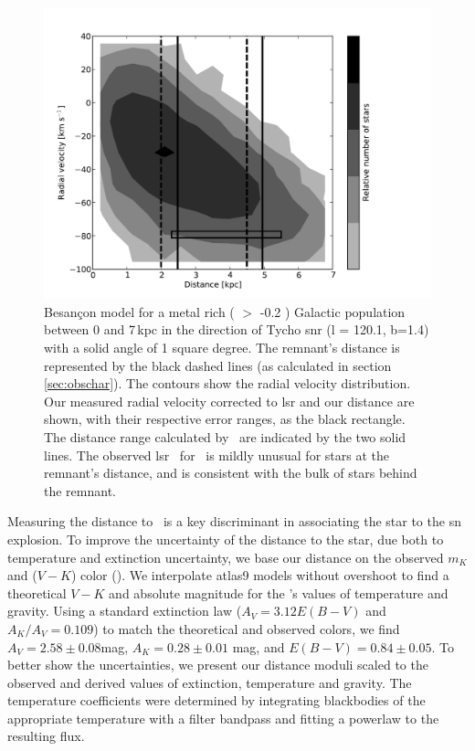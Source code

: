 \begin{figure}[htb!]
\centering
\includegraphics* [scale=0.5,angle=0]{chapter_sn1572_starg/plots/sn1572_d_vr_subaru.pdf}
\caption[Radial velocity of Tycho-G compared with the Besan\c{c}on Model]{Besan\c{c}on model for a metal rich ( $>$ -0.2 ) Galactic population between 0 and 7\,kpc in the direction of Tycho \gls{snr} (l = 120.1, b=1.4) with a solid angle of 1 square degree.
The remnant's distance is represented by the black dashed lines (as calculated in section \ref{sec:obschar}). The contours show the radial velocity distribution. 
Our measured radial velocity corrected to \gls{lsr} and our distance are shown, with their respective error ranges, as the black rectangle.  The distance  range calculated by \gh\ are indicated by the two solid lines. The observed \gls{lsr} \vrad\ for \starg\ is mildly unusual for stars at the remnant's distance, and is consistent with the bulk of stars behind
the remnant. }
\label{fig:bes_d_mu}
\end{figure}

Measuring the distance to \starg\ is a key discriminant in associating the star to the \gls{sn} explosion. To improve the uncertainty of the distance to the star, due both to temperature and extinction uncertainty,  we base our distance on the observed $m_K$ \citep{2006AJ....131.1163S} and ($V-K$) color (\rl).  We interpolate \gls{atlas9} models without overshoot \citep{1998A&A...333..231B} to find a theoretical $V-K$ and absolute magnitude for the \gh's values of temperature and gravity. Using a standard extinction law \citep*{1989ApJ...345..245C} ($A_V= 3.12 E(B-V)$ and $A_K/A_V=0.109$) to match the theoretical and observed colors, we find $A_V=2.58\pm0.08$mag, $A_K=0.28\pm 0.01$ mag, and $E(B-V)=0.84\pm0.05$.  To better show the uncertainties, we present our distance moduli scaled to the observed and derived values of extinction, temperature and gravity.
The temperature coefficients were determined by integrating blackbodies of the appropriate temperature with a filter bandpass and fitting a powerlaw to the resulting flux. \label{sec:distmod}
 
